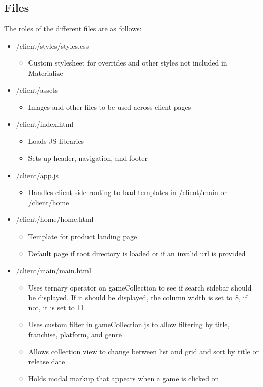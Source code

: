 \documentclass{article}
\begin{document}
\subsection{Files}
The roles of the different files are as follows:
\begin{itemize}
  \item /client/styles/styles.css
  \begin{itemize}
    \item Custom stylesheet for overrides and other styles not included in Materialize
  \end{itemize}
  \item /client/assets
  \begin{itemize}
    \item Images and other files to be used across client pages
  \end{itemize}
  \item /client/index.html
  \begin{itemize}
    \item Loads JS libraries
    \item Sets up header, navigation, and footer
  \end{itemize}
  \item /client/app.js
  \begin{itemize}
    \item Handles client side routing to load templates in /client/main or /client/home
  \end{itemize}
  \item /client/home/home.html
  \begin{itemize}
    \item Template for product landing page
    \item Default page if root directory is loaded or if an invalid url is provided
  \end{itemize}
  \item /client/main/main.html
  \begin{itemize}
    \item Uses ternary operator on gameCollection to see if search sidebar should be displayed. If it should be displayed, the column width is set to 8, if not, it is set to 11.
    \item Uses custom filter in gameCollection.js to allow filtering by title, franchise, platform, and genre
    \item Allows collection view to change between list and grid and sort by title or release date
    \item Holds modal markup that appears when a game is clicked on

\end{itemize}
\end{itemize}
\end{document}
